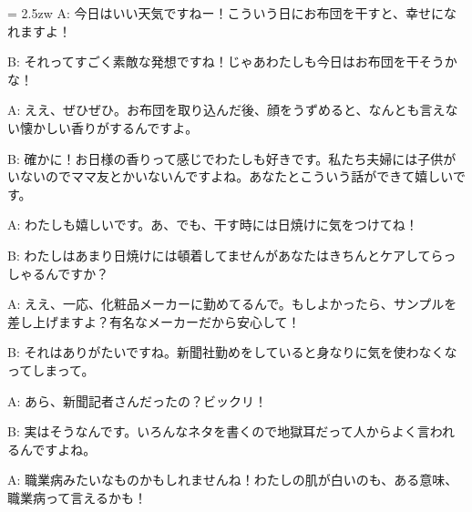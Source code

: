 \documentclass[11pt]{amsart}
\title{}
\author{}
\newenvironment{hangall}[1]{\hangindent = 2.5zw\everypar{\hangindent = 2.5zw}}{}
\begin{document}
\maketitle
\begin{hangall}{}%
A: 今日はいい天気ですねー！こういう日にお布団を干すと、幸せになれますよ！

B: それってすごく素敵な発想ですね！じゃあわたしも今日はお布団を干そうかな！

A: ええ、ぜひぜひ。お布団を取り込んだ後、顔をうずめると、なんとも言えない懐かしい香りがするんですよ。

B: 確かに！お日様の香りって感じでわたしも好きです。私たち夫婦には子供がいないのでママ友とかいないんですよね。あなたとこういう話ができて嬉しいです。

A: わたしも嬉しいです。あ、でも、干す時には日焼けに気をつけてね！

B: わたしはあまり日焼けには頓着してませんがあなたはきちんとケアしてらっしゃるんですか？

A: ええ、一応、化粧品メーカーに勤めてるんで。もしよかったら、サンプルを差し上げますよ？有名なメーカーだから安心して！

B: それはありがたいですね。新聞社勤めをしていると身なりに気を使わなくなってしまって。

A: あら、新聞記者さんだったの？ビックリ！

B: 実はそうなんです。いろんなネタを書くので地獄耳だって人からよく言われるんですよね。

A: 職業病みたいなものかもしれませんね！わたしの肌が白いのも、ある意味、職業病って言えるかも！
\end{hangall}
\end{document}

